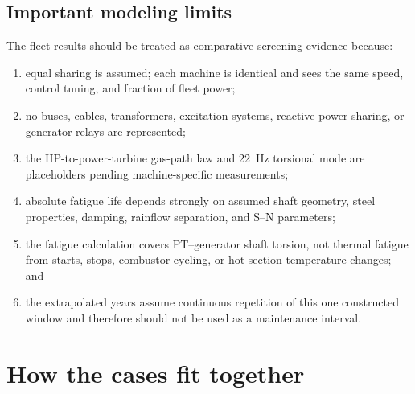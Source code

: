 \documentclass[11pt]{article}
\begin{document}
\subsection{Important modeling limits}

The fleet results should be treated as comparative screening evidence because:
\begin{enumerate}
  \item equal sharing is assumed; each machine is identical and sees the same
        speed, control tuning, and fraction of fleet power;
  \item no buses, cables, transformers, excitation systems, reactive-power
        sharing, or generator relays are represented;
  \item the HP-to-power-turbine gas-path law and \SI{22}{Hz} torsional mode are
        placeholders pending machine-specific measurements;
  \item absolute fatigue life depends strongly on assumed shaft geometry,
        steel properties, damping, rainflow separation, and S--N parameters;
  \item the fatigue calculation covers PT--generator shaft torsion, not
        thermal fatigue from starts, stops, combustor cycling, or hot-section
        temperature changes; and
  \item the extrapolated years assume continuous repetition of this one
        constructed window and therefore should not be used as a maintenance
        interval.
\end{enumerate}

\section{How the cases fit together}
\end{document}
